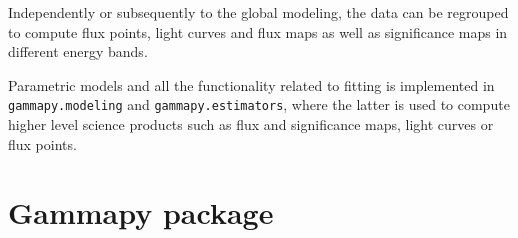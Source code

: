 \documentclass[longauth]{aa}
\newcommand{\code}[1]{\texttt{#1}}
\newcommand{\gammapy}{Gammapy\xspace}
\newcommand{\gammarays}{$\gamma$-rays\xspace}
\begin{document}
Independently or subsequently to the global modeling, the data can be regrouped to compute
flux points, light curves and flux maps as well as significance maps in different energy bands.

Parametric models and all the functionality related to fitting is implemented in 
\code{gammapy.modeling} and \code{gammapy.estimators}, where the latter is used to
compute higher level science products such as flux and significance maps,
light curves or flux points. 



 
 
 
 
 
 

\section{\gammapy package}
\label{sec:gammapy-package}
\end{document}
